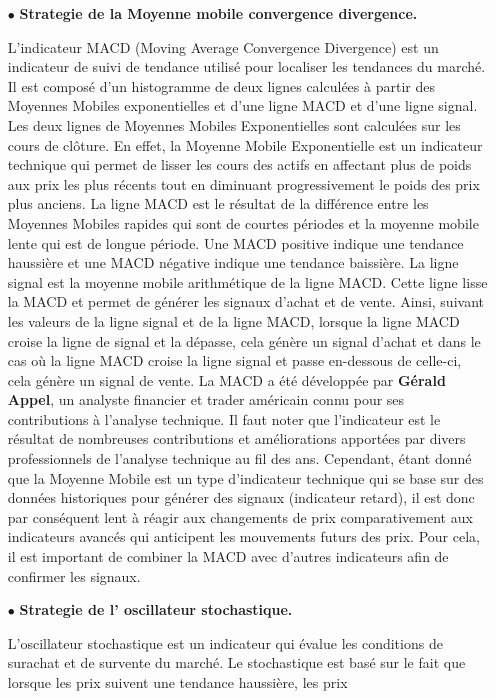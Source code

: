 \begin{itemize}
    \item[$\bullet$] \textbf{Strategie de la Moyenne mobile convergence divergence.}
    \par{L'indicateur MACD (Moving Average Convergence Divergence) est un indicateur de suivi de tendance 
    utilisé pour localiser les tendances du marché. Il est composé d'un histogramme de deux lignes 
    calculées à partir des Moyennes Mobiles exponentielles et d'une ligne MACD et d'une ligne signal.
    Les deux lignes de Moyennes Mobiles Exponentielles sont calculées sur les cours de clôture. 
    En effet, la Moyenne Mobile Exponentielle est un indicateur technique qui permet de lisser les cours
    des actifs en affectant plus de poids aux prix les plus récents tout en diminuant progressivement le
    poids des prix plus anciens.
    La ligne MACD est le résultat de la différence entre les Moyennes Mobiles rapides qui sont de courtes périodes et la moyenne 
    mobile lente qui est de longue période. 
    Une MACD positive indique une tendance haussière et une MACD négative indique une tendance baissière.
    La ligne signal est la moyenne mobile arithmétique de la ligne MACD. Cette ligne lisse la MACD et permet
    de générer les signaux d'achat et de vente.
    Ainsi, suivant les valeurs de la ligne signal et de la ligne MACD, lorsque la ligne MACD croise
    la ligne de signal et la dépasse, cela génère un signal d'achat et dans le cas où la ligne MACD croise 
    la ligne signal et passe en-dessous de celle-ci, cela génère un signal de vente.
    La MACD a été développée par \textbf{Gérald Appel}, un analyste financier et trader américain connu pour ses
    contributions à l'analyse technique. Il faut noter que l'indicateur est le résultat de nombreuses
    contributions et améliorations apportées par divers professionnels de l'analyse technique au fil des ans.
    Cependant, étant donné que la Moyenne Mobile est un type d'indicateur technique qui se base sur des 
    données historiques pour générer des signaux (indicateur retard), il est donc par conséquent lent à réagir aux
    changements de prix comparativement aux indicateurs avancés qui anticipent les mouvements futurs des prix. 
    Pour cela, il est important de combiner la MACD avec d'autres indicateurs afin de confirmer les signaux.}
    \newpage
    \item[$\bullet$] \textbf{Strategie de l' oscillateur stochastique.}
    \par{L'oscillateur stochastique est un indicateur qui évalue les conditions de surachat et de survente
    du marché. Le stochastique est basé sur le fait que lorsque les prix suivent une tendance haussière, les prix 
}
\end{itemize}
